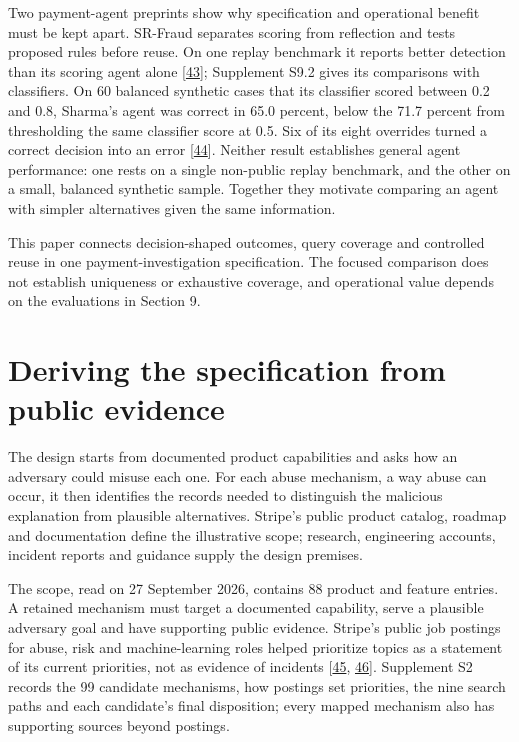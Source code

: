 \documentclass[acmlarge,review,anonymous,nonacm]{acmart}
\begin{document}
Two payment-agent preprints show why specification and operational
benefit must be kept apart. SR-Fraud separates scoring from reflection
and tests proposed rules before reuse. On one replay benchmark it
reports better detection than its scoring agent alone
{[}\protect\hyperlink{ref-Tan2026SRFraud}{43}{]}; Supplement S9.2 gives
its comparisons with classifiers. On 60 balanced synthetic cases that
its classifier scored between 0.2 and 0.8, Sharma's agent was correct in
65.0 percent, below the 71.7 percent from thresholding the same
classifier score at 0.5. Six of its eight overrides turned a correct
decision into an error
{[}\protect\hyperlink{ref-Sharma2026AuditableFraud}{44}{]}. Neither
result establishes general agent performance: one rests on a single
non-public replay benchmark, and the other on a small, balanced
synthetic sample. Together they motivate comparing an agent with simpler
alternatives given the same information.

This paper connects decision-shaped outcomes, query coverage and
controlled reuse in one payment-investigation specification. The focused
comparison does not establish uniqueness or exhaustive coverage, and
operational value depends on the evaluations in Section 9.

\hypertarget{deriving-the-specification-from-public-evidence}{%
\section{Deriving the specification from public
evidence}\label{deriving-the-specification-from-public-evidence}}

The design starts from documented product capabilities and asks how an
adversary could misuse each one. For each abuse mechanism, a way abuse
can occur, it then identifies the records needed to distinguish the
malicious explanation from plausible alternatives. Stripe's public
product catalog, roadmap and documentation define the illustrative
scope; research, engineering accounts, incident reports and guidance
supply the design premises.

The scope, read on 27 September 2026, contains 88 product and feature
entries. A retained mechanism must target a documented capability, serve
a plausible adversary goal and have supporting public evidence. Stripe's
public job postings for abuse, risk and machine-learning roles helped
prioritize topics as a statement of its current priorities, not as
evidence of incidents {[}\protect\hyperlink{ref-Stripe2026}{45},
\protect\hyperlink{ref-StripeARE2026}{46}{]}. Supplement S2 records the
99 candidate mechanisms, how postings set priorities, the nine search
paths and each candidate's final disposition; every mapped mechanism
also has supporting sources beyond postings.
\end{document}
